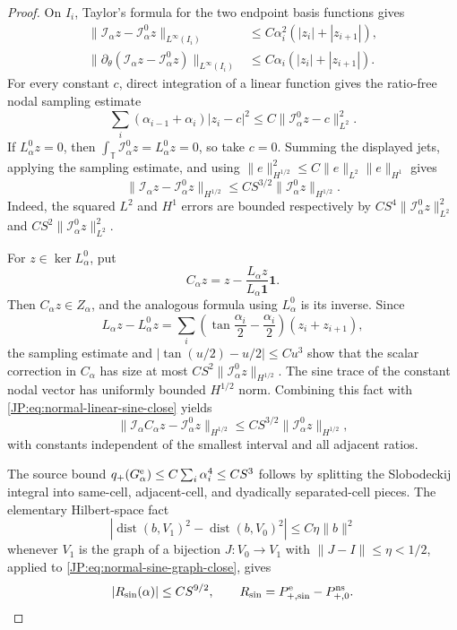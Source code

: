 \documentclass[11pt]{amsart}
\numberwithin{equation}{section}
\theoremstyle{definition}
\theoremstyle{remark}
\begin{document}
\begin{proof}
On $I_i$, Taylor's formula for the two endpoint basis functions gives
\begin{align*}
 \|\mathcal I_\alpha z-\mathcal I_\alpha^0z\|_{L^\infty(I_i)}
 &\le C\alpha_i^2(|z_i|+|z_{i+1}|),\\
 \|\partial_\theta(\mathcal I_\alpha z-\mathcal I_\alpha^0z)
        \|_{L^\infty(I_i)}
 &\le C\alpha_i(|z_i|+|z_{i+1}|).
\end{align*}
For every constant $c$, direct integration of a linear function gives the
ratio-free nodal sampling estimate
\[
 \sum_i(\alpha_{i-1}+\alpha_i)|z_i-c|^2
 \le C\|\mathcal I_\alpha^0z-c\|_{L^2}^2.
\]
If $L_\alpha^0z=0$, then
$\int_{\mathbb T}\mathcal I_\alpha^0z=L_\alpha^0z=0$, so take $c=0$.
Summing the displayed jets, applying the sampling estimate, and using
$\|e\|_{H^{1/2}}^2\le C\|e\|_{L^2}\|e\|_{H^1}$ gives
\begin{equation}\label{JP:eq:normal-linear-sine-close}
 \|\mathcal I_\alpha z-\mathcal I_\alpha^0z\|_{H^{1/2}}
 \le CS^{3/2}\|\mathcal I_\alpha^0z\|_{H^{1/2}}.
\end{equation}
Indeed, the squared $L^2$ and $H^1$ errors are bounded respectively by
$CS^4\|\mathcal I_\alpha^0z\|_{L^2}^2$ and
$CS^2\|\mathcal I_\alpha^0z\|_{L^2}^2$.

For $z\in\ker L_\alpha^0$, put
\[
 C_\alpha z=z-\frac{L_\alpha z}{L_\alpha\mathbf1}\mathbf1.
\]
Then $C_\alpha z\in Z_\alpha$, and the analogous formula using
$L_\alpha^0$ is its inverse.  Since
\[
 L_\alpha z-L_\alpha^0z
 =\sum_i\left(\tan\frac{\alpha_i}{2}-\frac{\alpha_i}{2}\right)
       (z_i+z_{i+1}),
\]
the sampling estimate and
$|\tan(u/2)-u/2|\le Cu^3$ show that the scalar correction in $C_\alpha$
has size at most $CS^2\|\mathcal I_\alpha^0z\|_{H^{1/2}}$.
The sine trace of the constant nodal vector has uniformly bounded
$H^{1/2}$ norm.  Combining this fact with
\eqref{JP:eq:normal-linear-sine-close} yields
\begin{equation}\label{JP:eq:normal-sine-graph-close}
 \|\mathcal I_\alpha C_\alpha z-\mathcal I_\alpha^0z\|_{H^{1/2}}
 \le CS^{3/2}\|\mathcal I_\alpha^0z\|_{H^{1/2}},
\end{equation}
with constants independent of the smallest interval and all adjacent
ratios.

The source bound
$q_+(G_\alpha^{\rm e})\le C\sum_i\alpha_i^4\le CS^3$
follows by splitting the Slobodeckij integral into same-cell,
adjacent-cell, and dyadically separated-cell pieces.  The elementary
Hilbert-space fact
\[
 \left|\operatorname {dist}(b,V_1)^2
       -\operatorname {dist}(b,V_0)^2\right|
 \le C\eta\|b\|^2
\]
whenever $V_1$ is the graph of a bijection $J:V_0\to V_1$ with
$\|J-I\|\le\eta<1/2$, applied to
\eqref{JP:eq:normal-sine-graph-close}, gives
\begin{equation}\label{JP:eq:normal-sine-absolute}
 |R_{\sin}(\alpha)|\le CS^{9/2},
 \qquad R_{\sin}=P_{+,\sin}^{\rm e}-P_{+,0}^{\rm ns}.
\end{equation}


\end{proof}
\end{document}
